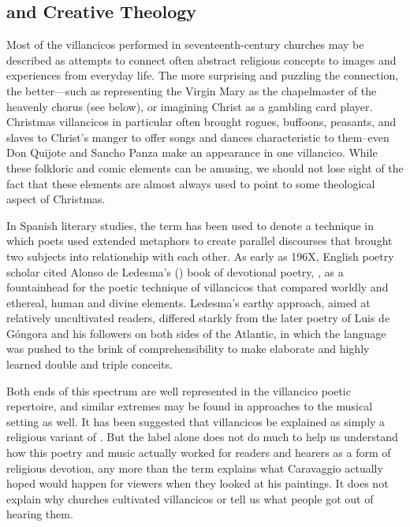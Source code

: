 \subsection{ and Creative Theology}

Most of the villancicos performed in seventeenth-century churches may be
described as attempts to connect often abstract religious concepts to images
and experiences from everyday life.
The more surprising and puzzling the connection, the better---such as
representing the Virgin Mary as the chapelmaster of the heavenly chorus (see
below), or imagining Christ as a gambling card player.%
    \Autocite{Cashner:PlayingCards}
Christmas villancicos in particular often brought rogues, buffoons, peasants,
and slaves to Christ's manger to offer songs and dances characteristic to
them--even Don Quijote and Sancho Panza make an appearance in one villancico.%
While these folkloric and comic elements can be amusing, we should not lose
sight of the fact that these elements are almost always used to point to some
theological aspect of Christmas.

In Spanish literary studies, the term  has been used to
denote a technique in which poets used extended metaphors to create parallel
discourses that brought two subjects into relationship with each other.
As early as 196X\XXX[name], English poetry scholar \XXX[name] cited Alonso de
Ledesma's (\XXX[year]) book of devotional poetry, , as a fountainhead for the poetic technique of villancicos that
compared worldly and ethereal, human and divine elements.%
Ledesma's earthy approach, aimed at relatively uncultivated readers, differed
starkly from the later  poetry of Luis de Góngora and his
followers on both sides of the Atlantic, in which the language was pushed to
the brink of comprehensibility to make elaborate and highly learned double and
triple conceits.%
    \Autocites{Tenorio:Gongorismo}
    [227--228]{Gaylord:Poetry}
    {Gracian:Ingenio}

Both ends of this spectrum are well represented in the villancico poetic
repertoire, and similar extremes may be found in approaches to the musical
setting as well.
It has been suggested that villancicos be explained as simply a religious
variant of .%
But the label  alone does not do much to help us understand
how this poetry and music actually worked for readers and hearers as a form of
religious devotion, any more than the term  explains what
Caravaggio actually hoped would happen for viewers when they looked at his
paintings.%
It does not explain why churches cultivated villancicos or tell us what people
got out of hearing them.

